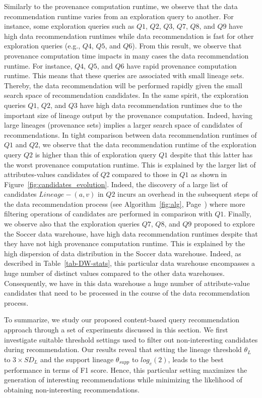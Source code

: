 Similarly to the provenance computation runtime, we observe that the data recommendation runtime varies from an exploration query to another.
For instance, some exploration queries such as $Q1$, $Q2$, $Q3$, $Q7$, $Q8$, and $Q9$ have high data recommendation runtimes while data recommendation is fast for other exploration queries (e.g., $Q4$, $Q5$, and $Q6$).
From this result, we observe that provenance computation time impacts in many cases the data recommendation runtime.
For instance, $Q4$, $Q5$, and $Q6$ have rapid provenance computation runtime. This means that these queries are associated with small lineage sets. Thereby, the data recommendation will be performed rapidly given the small search space of recommendation candidates.
In the same spirit, the exploration queries $Q1$, $Q2$, and $Q3$ have high data recommendation runtimes due to the important size of lineage output by the provenance computation.
Indeed, having large lineages (provenance sets) implies a larger search space of candidates of recommendations.
In tight comparison between data recommendation runtimes of  $Q1$ and $Q2$, we observe that the data recommendation runtime of the exploration query $Q2$ is higher than this of exploration query $Q1$ despite that this latter has the worst provenance computation runtime.
This is explained by the larger list of attributes-values candidates of $Q2$ compared to those in $Q1$ as shown in Figure~\ref{fig:candidates_evolution}.
 Indeed, the discovery of a large list of candidates $Lineage-(a,v)$ in $Q2$ incurs an overhead in the subsequent steps of the data recommendation process (see Algorithm~\ref{fig:alg}, Page~\pageref{fig:alg}) where more filtering operations of candidates are performed in comparison with $Q1$.
 Finally, we observe also that the exploration queries $Q7$, $Q8$, and $Q9$ proposed to explore the Soccer data warehouse, have high data recommendation runtimes despite that they have not high provenance computation runtime. 
This is explained by the high dispersion of data distribution in the Soccer data warehouse. Indeed, as described in Table~\ref{tab-DW-stats}, this particular data warehouse encompasses a huge number of distinct values compared to the other data warehouses. Consequently, we have in this data warehouse a huge number of attribute-value candidates that need to be processed in the course of the data recommendation process.



To summarize, we study our proposed content-based  query recommendation approach through a set of experiments discussed in this section.
We first investigate suitable threshold settings used to filter out non-interesting candidates during recommendation. Our results reveal that setting the lineage threshold $\theta_{L}$ to $3 \times SD_{L}$  and the support lineage $\theta_{supp}$ to $log_e(2)$, leads to the best performance in terms of F1 score. Hence, this particular setting maximizes the generation of interesting recommendations while minimizing the likelihood of obtaining non-interesting recommendations.


